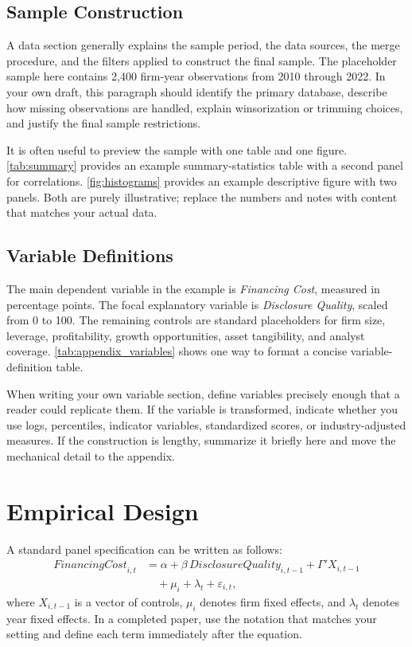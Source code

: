 \documentclass[hidelinks,12pt]{article}
\begin{document}
\subsection{Sample Construction}

A data section generally explains the sample period, the data sources, the merge procedure, and the filters applied to construct the final sample. The placeholder sample here contains 2,400 firm-year observations from 2010 through 2022. In your own draft, this paragraph should identify the primary database, describe how missing observations are handled, explain winsorization or trimming choices, and justify the final sample restrictions.

It is often useful to preview the sample with one table and one figure. \autoref{tab:summary} provides an example summary-statistics table with a second panel for correlations. \autoref{fig:histograms} provides an example descriptive figure with two panels. Both are purely illustrative; replace the numbers and notes with content that matches your actual data.

\subsection{Variable Definitions}

The main dependent variable in the example is \textit{Financing Cost}, measured in percentage points. The focal explanatory variable is \textit{Disclosure Quality}, scaled from 0 to 100. The remaining controls are standard placeholders for firm size, leverage, profitability, growth opportunities, asset tangibility, and analyst coverage. \autoref{tab:appendix_variables} shows one way to format a concise variable-definition table.

When writing your own variable section, define variables precisely enough that a reader could replicate them. If the variable is transformed, indicate whether you use logs, percentiles, indicator variables, standardized scores, or industry-adjusted measures. If the construction is lengthy, summarize it briefly here and move the mechanical detail to the appendix.

\section{Empirical Design}
\label{sec:design}

A standard panel specification can be written as follows:
\begin{equation}
\label{eq:baseline}
\begin{aligned}
\textit{FinancingCost}_{i,t}
&=
\alpha
+
\beta\,\textit{DisclosureQuality}_{i,t-1}
+
\Gamma'X_{i,t-1}
\\
&\quad
+
\mu_i
+
\lambda_t
+
\varepsilon_{i,t},
\end{aligned}
\end{equation}
where $X_{i,t-1}$ is a vector of controls, $\mu_i$ denotes firm fixed effects, and $\lambda_t$ denotes year fixed effects. In a completed paper, use the notation that matches your setting and define each term immediately after the equation.
\end{document}
